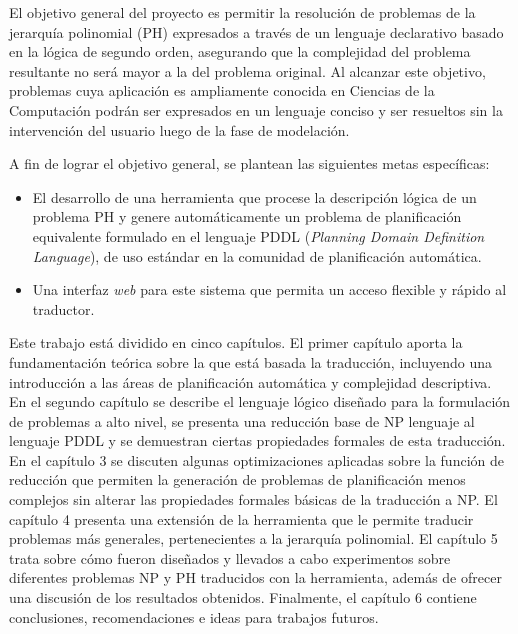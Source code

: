 El objetivo general del proyecto es permitir la resolución de problemas
de la jerarquía polinomial (PH) expresados a través de un lenguaje declarativo basado en 
la lógica de segundo orden, asegurando que la complejidad del problema
resultante no será mayor a la del problema original. Al alcanzar este objetivo, problemas cuya aplicación es
ampliamente conocida en Ciencias de la Computación podrán ser expresados
en un lenguaje conciso y ser resueltos sin la intervención del usuario luego de
la fase de modelación.

A fin de lograr el objetivo general, se plantean las siguientes metas
específicas:
\begin{itemize}
\item El desarrollo de una herramienta que procese la descripción lógica de un problema 
PH y genere automáticamente un problema de planificación equivalente 
formulado en el lenguaje PDDL (\textit{Planning Domain Definition Language}),
de uso estándar en la comunidad de planificación automática.
\item Una interfaz \textit{web} para este sistema que permita un acceso flexible
y rápido al traductor.
\end{itemize}

Este trabajo está dividido en cinco capítulos. El primer capítulo aporta la
fundamentación teórica sobre la que está basada la traducción, incluyendo una
introducción a las áreas de planificación automática y complejidad descriptiva.
En el segundo capítulo se describe el lenguaje lógico diseñado para la
formulación de problemas a alto nivel, se presenta una reducción base de NP
lenguaje al lenguaje PDDL y se demuestran ciertas propiedades formales de esta
traducción. En el capítulo 3 se discuten algunas optimizaciones aplicadas sobre
la función de reducción que permiten la generación de problemas de
planificación menos complejos sin alterar las propiedades formales básicas de
la traducción a NP. El capítulo 4 presenta una extensión de la herramienta que
le permite traducir problemas más generales, pertenecientes a la jerarquía
polinomial.
El capítulo 5 trata sobre cómo fueron diseñados y llevados a
cabo experimentos sobre diferentes problemas NP y PH traducidos con la herramienta,
además de ofrecer una discusión de los resultados obtenidos. Finalmente, el
capítulo 6 contiene conclusiones, recomendaciones e ideas para trabajos
futuros.

